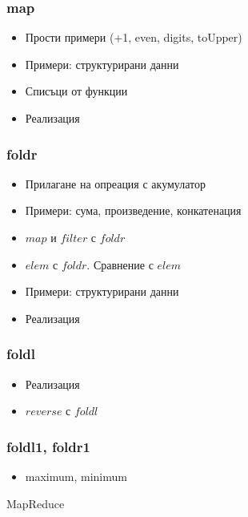 \documentclass{beamer}
\begin{document}
\begin{frame}[fragile]
  \frametitle{map}

  \begin{itemize}
    \item Прости примери (+1, even, digits, toUpper)
    \item Примери: структурирани данни
    \item Списъци от функции
    \item Реализация
  \end{itemize}

\end{frame}

\begin{frame}[fragile]
  \frametitle{foldr}

  \begin{itemize}
    \item Прилагане на опреация с акумулатор
    \item Примери: сума, произведение, конкатенация
    \item $map$ и $filter$ с $foldr$
    \item $elem$ с $foldr$. Сравнение с $elem$
    \item Примери: структурирани данни
    \item Реализация
  \end{itemize}

\end{frame}


\begin{frame}[fragile]
  \frametitle{foldl}

  \begin{itemize}
    \item Реализация
    \item $reverse$ с $foldl$
  \end{itemize}
\end{frame}

\begin{frame}[fragile]
  \frametitle{foldl1, foldr1}

  \begin{itemize}
    \item maximum, minimum
  \end{itemize}
\end{frame}


\begin{frame}
  \centerline{MapReduce}
\end{frame}
\end{document}
